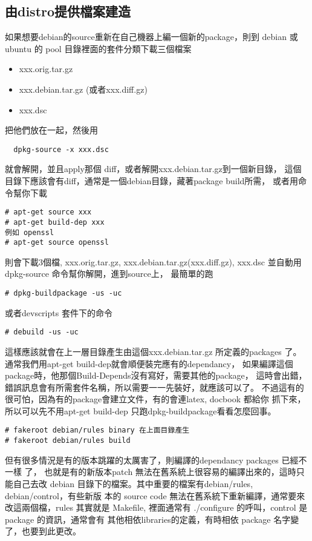   \subsection{由distro提供檔案建造}
  如果想要debian的source重新在自己機器上編一個新的package，則到 debian 或
  ubuntu 的 pool 目錄裡面的套件分類下載三個檔案
  \begin{itemize}
    \item xxx.orig.tar.gz
    \item xxx.debian.tar.gz (或者xxx.diff.gz)
    \item xxx.dsc
  \end{itemize}
  把他們放在一起，然後用
  \begin{verbatim}
  dpkg-source -x xxx.dsc
  \end{verbatim}
  就會解開，並且apply那個 diff，或者解開xxx.debian.tar.gz到一個新目錄，
  這個目錄下應該會有diff，通常是一個debian目錄，藏著package build所需，
  或者用命令幫你下載
  \begin{verbatim}
# apt-get source xxx
# apt-get build-dep xxx
例如 openssl
# apt-get source openssl
  \end{verbatim}
  則會下載3個檔, xxx.orig.tar.gz, xxx.debian.tar.gz(xxx.diff.gz), xxx.dsc
  並自動用 dpkg-source 命令幫你解開，進到source上， 最簡單的跑
  \begin{verbatim}
# dpkg-buildpackage -us -uc
  \end{verbatim}
  或者devscripts 套件下的命令
  \begin{verbatim}
# debuild -us -uc
  \end{verbatim}
  這樣應該就會在上一層目錄產生由這個xxx.debian.tar.gz 所定義的packages 了。
  通常我們用apt-get build-dep就會順便裝完應有的dependancy，
  如果編譯這個package時，他那個Build-Depends沒有寫好，需要其他的package，
  這時會出錯，錯誤訊息會有所需套件名稱，所以需要一一先裝好，就應該可以了。
  不過這有的很可怕，因為有的package會建立文件，有的會連latex, docbook 都給你
  抓下來， 所以可以先不用apt-get build-dep 只跑dpkg-buildpackage看看怎麼回事。
  \begin{verbatim}
# fakeroot debian/rules binary 在上面目錄產生
# fakeroot debian/rules build
  \end{verbatim}
  但有很多情況是有的版本跳躍的太厲害了，則編譯的dependancy packages 已經不一樣
  了， 也就是有的新版本patch 無法在舊系統上很容易的編譯出來的，這時只能自己去改
  debian 目錄下的檔案。其中重要的檔案有debian/rules, debian/control，有些新版
  本的 source code 無法在舊系統下重新編譯，通常要來改這兩個檔，rules 其實就是
  Makefile, 裡面通常有 ./configure 的呼叫，control 是 package 的資訊，通常會有
  其他相依libraries的定義，有時相依 package 名字變了，也要到此更改。

